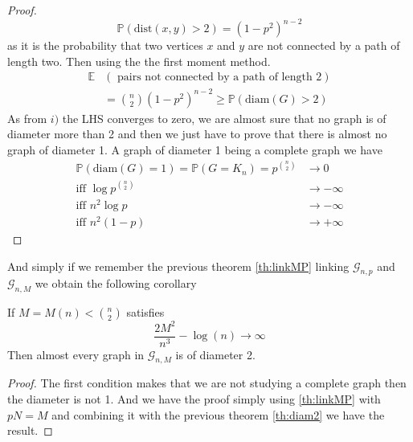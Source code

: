 \begin{proof}
	\begin{equation}
		\mathbb{P}(\text{dist}(x, y) > 2) = (1-p^2)^{n-2}
	\end{equation}
	as it is the probability that two vertices $x$ and $y$ are not connected by a path of length two.
	\newline
	Then using the the first moment method.
	\begin{align}
		\mathbb{E}&(\text{ pairs not connected by a path of length 2})	\\
				&= \binom{n}{2}(1-p^2)^{n-2} \geq \mathbb{P}(\text{diam}(G) > 2)
	\end{align}
	As from $i)$ the LHS converges to zero, we are almost sure that no graph is of diameter more than 2 and then we just have to prove that there is almost no graph of diameter 1.
	A graph of diameter 1 being a complete graph we have
	\begin{align}
		\mathbb{P}(\text{diam}(G) = 1) = \mathbb{P}(G = K_n) 	
				= p^{\binom{n}{2}} &\longrightarrow 0				\\
		\text{iff  } \log p^{\binom{n}{2}} &\longrightarrow -\infty			\\
			   \text{iff  } n^2 \log p &\longrightarrow -\infty			\\
			    \text{iff  } n^2 (1-p) &\longrightarrow +\infty			
	\end{align}	
\end{proof}
And simply if we remember the previous theorem \ref{th:linkMP} linking $\mathcal{G}_{n,p}$ and $\mathcal{G}_{n,M}$ we obtain the following corollary

\begin{corollary}
	If $M=M(n) < \binom{n}{2}$ satisfies 
	\begin{equation}
		\frac{2M^2}{n^3} - \log(n) \longrightarrow \infty
	\end{equation}
	Then almost every graph in $\mathcal{G}_{n, M}$ is of diameter 2.
\end{corollary}
\begin{proof}
	The first condition makes that we are not studying a complete graph then the diameter is not 1.
	And we have the proof simply using \ref{th:linkMP} with $pN = M$ and combining it with the previous theorem \ref{th:diam2} we have the result.
\end{proof}

